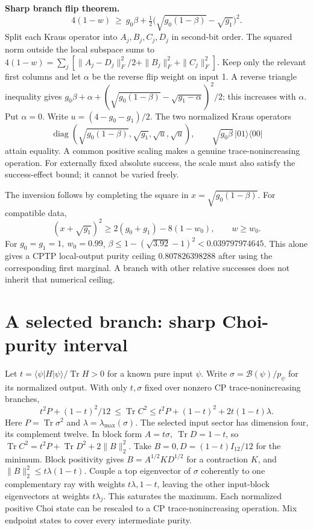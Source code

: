 \documentclass[
  10pt,
  a4paper,
]{article}
\begin{document}
\textbf{Sharp branch flip theorem.} \[
 4(1-w)\ \ge\ g_0\beta+
 \tfrac12\bigl(\sqrt{g_0(1-\beta)}-\sqrt{g_1}\bigr)^2 .
\] Split each Kraus operator into \(A_j,B_j,C_j,D_j\) in second-bit order. The squared norm outside the local subspace sums to \(4(1-w)=\sum_j[\|A_j-D_j\|_F^2/2+\|B_j\|_F^2+\|C_j\|_F^2]\). Keep only the relevant first columns and let \(\alpha\) be the reverse flip weight on input 1. A reverse triangle inequality gives \(g_0\beta+\alpha+(\sqrt{g_0(1-\beta)}-\sqrt{g_1-\alpha})^2/2\); this increases with \(\alpha\). Put \(\alpha=0\). Write \(u=(4-g_0-g_1)/2\). The two normalized Kraus operators \[
 \operatorname{diag}(\sqrt{g_0(1-\beta)},\sqrt{g_1},\sqrt u,\sqrt u),\qquad
 \sqrt{g_0\beta}\,|01\rangle\langle00|
\] attain equality. A common positive scaling makes a genuine trace-nonincreasing operation. For externally fixed absolute success, the scale must also satisfy the success-effect bound; it cannot be varied freely.

The inversion follows by completing the square in \(x=\sqrt{g_0(1-\beta)}\). For compatible data, \[
 (x+\sqrt{g_1})^2\ge2(g_0+g_1)-8(1-w_0),\qquad w\ge w_0.
\] For \(g_0=g_1=1,\ w_0=0.99\), \(\beta\le 1-(\sqrt{3.92}-1)^2<0.039797974645\). This alone gives a CPTP local-output purity ceiling \(0.807826398288\) after using the corresponding first marginal. A branch with other relative successes does not inherit that numerical ceiling.

\newpage

\section{A selected branch: sharp Choi-purity interval}\label{a-selected-branch-sharp-choi-purity-interval}

Let \(t=\langle\psi|H|\psi\rangle/\operatorname{Tr}H>0\) for a known pure input \(\psi\). Write \(\sigma=\mathcal B(\psi)/p_\psi\) for its normalized output. With only \(t,\sigma\) fixed over nonzero CP trace-nonincreasing branches, \[
 \boxed{t^2 P+(1-t)^2/12\ \le\operatorname{Tr}C^2
 \le t^2P+(1-t)^2+2t(1-t)\lambda.}
\] Here \(P=\operatorname{Tr}\sigma^2\) and \(\lambda=\lambda_{\max}(\sigma)\). The selected input sector has dimension four, its complement twelve. In block form \(A=t\sigma,\ \operatorname{Tr}D=1-t\), so \(\operatorname{Tr}C^2=t^2P+\operatorname{Tr}D^2+2\|B\|_2^2\). Take \(B=0,D=(1-t)I_{12}/12\) for the minimum. Block positivity gives \(B=A^{1/2}KD^{1/2}\) for a contraction \(K\), and \(\|B\|_2^2\le t\lambda(1-t)\). Couple a top eigenvector of \(\sigma\) coherently to one complementary ray with weights \(t\lambda,1-t\), leaving the other input-block eigenvectors at weights \(t\lambda_j\). This saturates the maximum. Each normalized positive Choi state can be rescaled to a CP trace-nonincreasing operation. Mix endpoint states to cover every intermediate purity.
\end{document}
